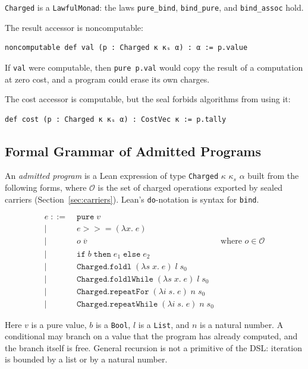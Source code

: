 \documentclass[acmsmall,nonacm]{acmart}
\begin{document}
\lstinline{Charged} is a \lstinline{LawfulMonad}: the laws \lstinline{pure_bind}, \lstinline{bind_pure}, and \lstinline{bind_assoc} hold.

The result accessor is noncomputable:

\begin{lstlisting}
noncomputable def val (p : Charged κ κₛ α) : α := p.value
\end{lstlisting}

If \lstinline{val} were computable, then \lstinline{pure p.val} would copy the result of a computation at zero cost, and a program could erase its own charges.

The cost accessor is computable, but the seal forbids algorithms from using it:

\begin{lstlisting}
def cost (p : Charged κ κₛ α) : CostVec κ := p.tally
\end{lstlisting}

\subsection{Formal Grammar of Admitted Programs}\label{sec:grammar}

An \emph{admitted program} is a Lean expression of type \lstinline{Charged} $\kappa$ $\kappa_s$ $\alpha$ built from the following forms, where $\mathcal{O}$ is the set of charged operations exported by sealed carriers (Section~\ref{sec:carriers}).
Lean's \lstinline{do}-notation is syntax for \lstinline{bind}.

\begin{align*}
e \;::=\;& \texttt{pure}\; v \\
  \mid\;& e \mathbin{>\!\!>\!\!=} (\lambda x.\; e) \\
  \mid\;& o\; \overline{v} &\text{where } o \in \mathcal{O} \\
  \mid\;& \texttt{if}\; b\; \texttt{then}\; e_1\; \texttt{else}\; e_2 \\
  \mid\;& \texttt{Charged.foldl}\; (\lambda s\; x.\; e)\; l\; s_0 \\
  \mid\;& \texttt{Charged.foldlWhile}\; (\lambda s\; x.\; e)\; l\; s_0 \\
  \mid\;& \texttt{Charged.repeatFor}\; (\lambda i\; s.\; e)\; n\; s_0 \\
  \mid\;& \texttt{Charged.repeatWhile}\; (\lambda i\; s.\; e)\; n\; s_0
\end{align*}

Here $v$ is a pure value, $b$ is a \lstinline{Bool}, $l$ is a \lstinline{List}, and $n$ is a natural number.
A conditional may branch on a value that the program has already computed, and the branch itself is free.
General recursion is not a primitive of the DSL: iteration is bounded by a list or by a natural number.
\end{document}
